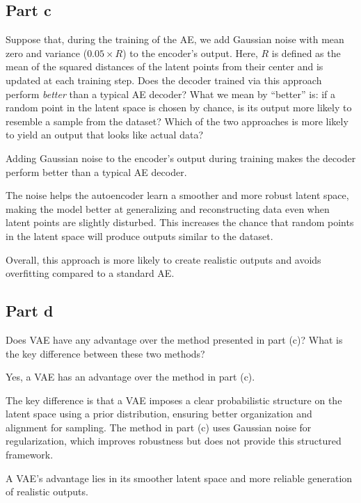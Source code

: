 \subsection{Part c}
Suppose that, during the training of the AE, we add Gaussian noise with mean zero and variance ($0.05 \times R$) to the encoder's output. Here, \(R\) is defined as the mean of the squared distances of the latent points from their center and is updated at each training step. Does the decoder trained via this approach perform \emph{better} than a typical AE decoder? What we mean by ``better'' is: if a random point in the latent space is chosen by chance, is its output more likely to resemble a sample from the dataset? Which of the two approaches is more likely to yield an output that looks like actual data?
\begin{qsolve}
    \begin{qsolve}[]
        Adding Gaussian noise to the encoder's output during training makes the decoder perform better than a typical AE decoder. 

        The noise helps the autoencoder learn a smoother and more robust latent space, making the model better at generalizing and reconstructing data even when latent points are slightly disturbed. This increases the chance that random points in the latent space will produce outputs similar to the dataset.

        Overall, this approach is more likely to create realistic outputs and avoids overfitting compared to a standard AE.
    \end{qsolve}
\end{qsolve}
\subsection{Part d}
Does VAE have any advantage over the method presented in part (c)? 
What is the key difference between these two methods?
\begin{qsolve}
    \begin{qsolve}[]
        Yes, a VAE has an advantage over the method in part (c). 

        The key difference is that a VAE imposes a clear probabilistic structure on the latent space using a prior distribution, ensuring better organization and alignment for sampling. The method in part (c) uses Gaussian noise for regularization, which improves robustness but does not provide this structured framework.
        
        A VAE's advantage lies in its smoother latent space and more reliable generation of realistic outputs.
    \end{qsolve}
\end{qsolve}